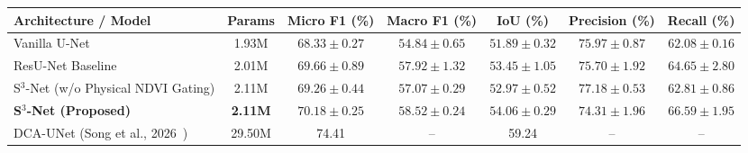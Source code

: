 \begin{tabular}{lcccccc}
\toprule
\textbf{Architecture / Model} & \textbf{Params} & \textbf{Micro F1 (\%)} & \textbf{Macro F1 (\%)} & \textbf{IoU (\%)} & \textbf{Precision (\%)} & \textbf{Recall (\%)} \\
\midrule
Vanilla U-Net~\cite{meena2023hrgldd,ronneberger2015unet} & 1.93M & $68.33 \pm 0.27$ & $54.84 \pm 0.65$ & $51.89 \pm 0.32$ & $75.97 \pm 0.87$ & $62.08 \pm 0.16$ \\
ResU-Net Baseline~\cite{meena2023hrgldd,zhang2018resunet} & 2.01M & $69.66 \pm 0.89$ & $57.92 \pm 1.32$ & $53.45 \pm 1.05$ & $75.70 \pm 1.92$ & $64.65 \pm 2.80$ \\
S$^3$-Net (w/o Physical NDVI Gating) & 2.11M & $69.26 \pm 0.44$ & $57.07 \pm 0.29$ & $52.97 \pm 0.52$ & $\mathbf{77.18 \pm 0.53}$ & $62.81 \pm 0.86$ \\
\textbf{S$^3$-Net (Proposed)} & \textbf{2.11M} & $\mathbf{70.18 \pm 0.25}$ & $\mathbf{58.52 \pm 0.24}$ & $\mathbf{54.06 \pm 0.29}$ & $74.31 \pm 1.96$ & $\mathbf{66.59 \pm 1.95}$ \\
\midrule
DCA-UNet (Song et al., 2026~\cite{dcaunet2026}) & 29.50M & 74.41 & -- & 59.24 & -- & -- \\
\bottomrule
\end{tabular}
